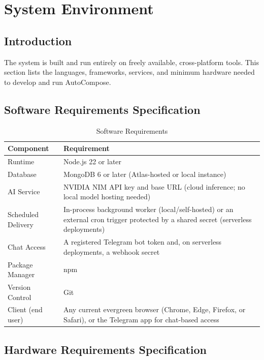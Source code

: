 \documentclass[12pt,a4paper]{article}
\begin{document}
\section{System Environment}

\subsection{Introduction}

The system is built and run entirely on freely available, cross-platform tools. This section lists the languages, frameworks, services, and minimum hardware needed to develop and run AutoCompose.

\subsection{Software Requirements Specification}

\begin{table}[h]
\centering
\caption{Software Requirements}
\begin{tabularx}{\textwidth}{@{}l X@{}}
\toprule
\textbf{Component} & \textbf{Requirement} \\
\midrule
Runtime              & Node.js 22 or later \\
Database             & MongoDB 6 or later (Atlas-hosted or local instance) \\
AI Service           & NVIDIA NIM API key and base URL (cloud inference; no local model hosting needed) \\
Scheduled Delivery    & In-process background worker (local/self-hosted) or an external cron trigger protected by a shared secret (serverless deployments) \\
Chat Access           & A registered Telegram bot token and, on serverless deployments, a webhook secret \\
Package Manager      & npm \\
Version Control      & Git \\
Client (end user)     & Any current evergreen browser (Chrome, Edge, Firefox, or Safari), or the Telegram app for chat-based access \\
\bottomrule
\end{tabularx}
\end{table}

\subsection{Hardware Requirements Specification}
\end{document}
